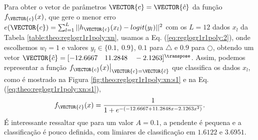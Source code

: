 \begin{SolutionT}\label{sol:theo:reglogr1r1poly:s1}
Para obter o vetor de parâmetros $\VECTOR{c}=\VECTOR{\hat{c}}$ da função $f_{\VECTOR{c}}(x)$, 
que gere o menor erro $e(\VECTOR{c}) =   \sum_{l=1}^{L} ||h_{\VECTOR{c}}(x_l)-logit(y_l)||^2$
com os $L=12$ dados $x_l$ da Tabela \ref{table:theo:reglogr1r1poly:xn},
usamos a Eq. (\ref{eq:reglogr1r1poly:2}), onde escolhemos $w_l=1$ e valores $y_l \in \{0.1,~ 0.9\}$,
$0.1$ para $\bigtriangleup$ e $0.9$ para $\bigcirc$,
obtendo um vetor $\VECTOR{\hat{c}}=[-12.6667\quad 11.2848\quad -2.1263]^{\transpose}$.
Assim, podemos representar a função 
$\left.f_{\VECTOR{c}}(x)\right|_{\VECTOR{c}=\VECTOR{\hat{c}}}$ que classifica os dados $x_l$, 
como é mostrado na Figura \ref{fig:theo:reglogr1r1poly:xn:s1} e na Eq. (\ref{eq:theo:reglogr1r1poly:xn:s1}),
\begin{equation}\label{eq:theo:reglogr1r1poly:xn:s1}
f_{\VECTOR{\hat{c}}}(x)= \frac{1}{1+e^{-(-12.6667  +11.2848 x  -2.1263 x^2)}}.
\end{equation}
É interessante ressaltar que para um valor $A=0.1$, a pendente é pequena e a classificação é pouco definida,
com limiares de classificação em $1.6122$ e $3.6951$.
\end{SolutionT}


